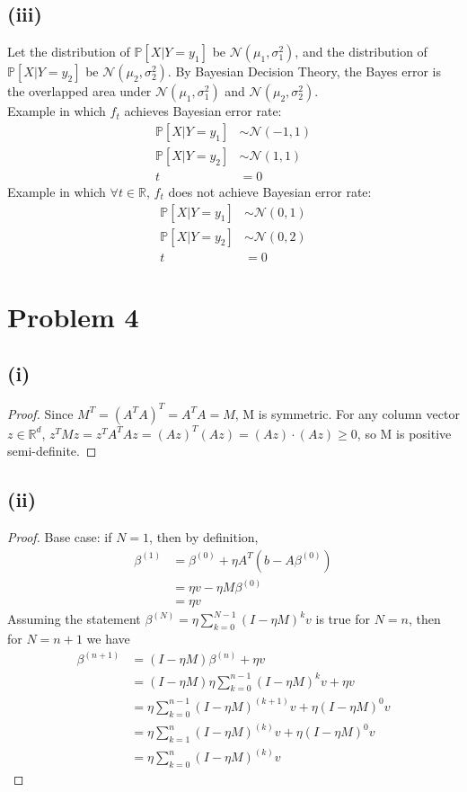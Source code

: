 \documentclass[twoside,11pt]{homework}
\begin{document}
\subsection*{(iii)}
	Let the distribution of $\mathbb{P}[X|Y=y_1]$ be $\mathcal{N}(\mu_1,\sigma_1^2)$, 
	and the distribution of $\mathbb{P}[X|Y=y_2]$ be $\mathcal{N}(\mu_2,\sigma_2^2)$.
	By Bayesian Decision Theory, the Bayes error is the overlapped area under $\mathcal{N}(\mu_1,\sigma_1^2)$
	and $\mathcal{N}(\mu_2,\sigma_2^2)$. \\
	Example in which $f_t$ achieves Bayesian error rate:
	\begin{align*}
		\mathbb{P}[X|Y=y_1] &\sim \mathcal{N}(-1, 1)\\
		\mathbb{P}[X|Y=y_2] &\sim \mathcal{N}(1, 1) \\
		t&=0
	\end{align*}
	Example in which $\forall t\in \mathbb{R}$, $f_t$ does not achieve Bayesian error rate:
	\begin{align*}
		\mathbb{P}[X|Y=y_1] &\sim \mathcal{N}(0, 1)\\
		\mathbb{P}[X|Y=y_2] &\sim \mathcal{N}(0, 2) \\
		t&=0
	\end{align*}


\section*{Problem 4} 
\subsection*{(i)}
	\begin{proof}
		Since $M^{T} = (A^{T}A)^{T} = A^{T}A = M$, M is symmetric. 
		For any column vector $z\in \mathbb{R}^d$, $z^TMz = z^TA^TAz = (Az)^T (Az) = (Az)\cdot(Az) \geq 0$, 
		so M is positive semi-definite.
	\end{proof}
\subsection*{(ii)}
	\begin{proof}
		Base case: if $N=1$, then by definition, 
		\begin{align*}
			\beta^{(1)} &= \beta^{(0)}+ \eta  A^{T} (b-A \beta^{(0)}) \\
			&= \eta v - \eta M \beta^{(0)} \\
			&= \eta v 
		\end{align*}
		Assuming the statement $\beta^{(N)} = \eta \sum_{k=0}^{N-1} (I-\eta M)^k v$ is true for $N=n$, then for $N=n+1$ we have
		\begin{align*}
			\beta^{(n+1)} &= (I-\eta M) \beta^{(n)} + \eta v \tag{definition} \\
			&= (I-\eta M) \eta  \sum_{k=0}^{n-1} (I-\eta M)^k v + \eta v \tag{induction hypothesis} \\
			&= \eta  \sum_{k=0}^{n-1} (I-\eta M)^{(k+1)} v + \eta (I-\eta M)^0 v \\
			&= \eta  \sum_{k=1}^{n} (I-\eta M)^{(k)} v + \eta (I-\eta M)^0 v \\
			&= \eta  \sum_{k=0}^{n} (I-\eta M)^{(k)} v
		\end{align*}
	\end{proof}
\end{document}
